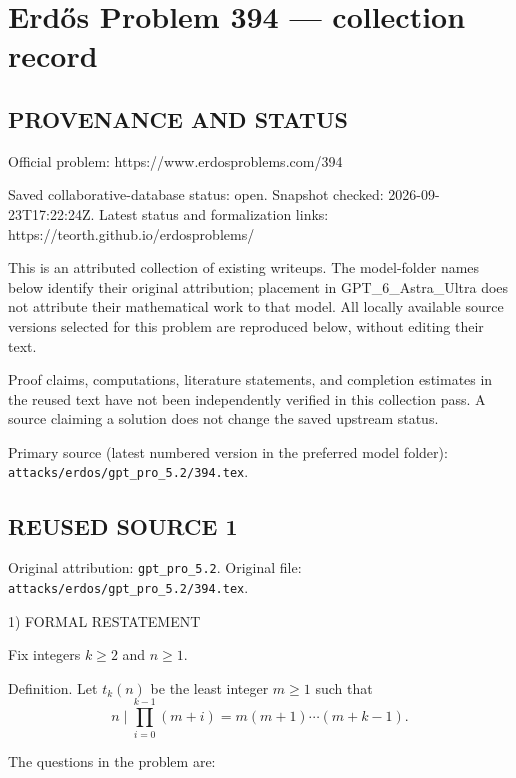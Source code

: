\section*{Erd\H{o}s Problem 394 --- collection record}

\subsection*{PROVENANCE AND STATUS}
Official problem: https://www.erdosproblems.com/394

Saved collaborative-database status: open.
Snapshot checked: 2026-09-23T17:22:24Z.
Latest status and formalization links: https://teorth.github.io/erdosproblems/

This is an attributed collection of existing writeups. The model-folder names below identify their original attribution; placement in GPT\_6\_Astra\_Ultra does not attribute their mathematical work to that model. All locally available source versions selected for this problem are reproduced below, without editing their text.

Proof claims, computations, literature statements, and completion estimates in the reused text have not been independently verified in this collection pass. A source claiming a solution does not change the saved upstream status.

Primary source (latest numbered version in the preferred model folder): \texttt{attacks/erdos/gpt\_pro\_5.2/394.tex}.

\subsection*{REUSED SOURCE 1}
Original attribution: \texttt{gpt\_pro\_5.2}.
Original file: \texttt{attacks/erdos/gpt\_pro\_5.2/394.tex}.


1) FORMAL RESTATEMENT

Fix integers $k\ge 2$ and $n\ge 1$.

Definition.
Let $t_k(n)$ be the least integer $m\ge 1$ such that
\[
 n\mid \prod_{i=0}^{k-1} (m+i)=m(m+1)\cdots (m+k-1).
\]

The questions in the problem are:

